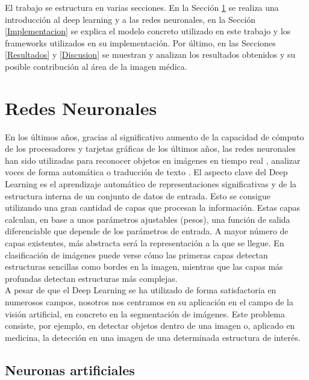 \documentclass[spanish,a4paper, 11pt]{article}
\numberwithin{equation}{section}
\numberwithin{table}{section}
\numberwithin{figure}{section}
\begin{document}
El trabajo se estructura en varias secciones. En la Sección \ref{RedesNeur} se realiza una introducción al deep learning y a las redes neuronales, en la Sección \ref{Implementacion} se explica el modelo concreto utilizado en este trabajo y los frameworks utilizados en su implementación. Por último, en las Secciones \ref{Resultados} y \ref{Discusion} se muestran y analizan los resultados obtenidos y su posible contribución al área de la imagen médica.

\newpage
\section{Redes Neuronales}
\label{RedesNeur}

En los últimos años, gracias al significativo aumento de la capacidad de cómputo de los procesadores y tarjetas gráficas de los últimos años, las redes neuronales han sido utilizadas para reconocer objetos en imágenes en tiempo real \cite{Redmon2015}, analizar voces de forma automática \cite{Hinton2012} o traducción de texto \cite{Vinyals2014}. El aspecto clave del Deep Learning es el aprendizaje automático de representaciones significativas y de la estructura interna de un conjunto de datos de entrada. Esto se consigue utilizando una gran cantidad de capas que procesan la información. Estas capas calculan, en base a unos parámetros ajustables (pesos), una función de salida diferenciable que depende de los parámetros de entrada. A mayor número de capas existentes, más abstracta será la representación a la que se llegue. En clasificación de imágenes puede verse cómo las primeras capas detectan estructuras sencillas como bordes en la imagen, mientras que las capas más profundas detectan estructuras más complejas.\\

A pesar de que el Deep Learning se ha utilizado de forma satisfactoria en numerosos campos, nosotros nos centramos en su aplicación en el campo de la visión artificial, en concreto en la segmentación de imágenes. Este problema consiste, por ejemplo, en detectar objetos dentro de una imagen o, aplicado en medicina, la detección en una imagen de una determinada estructura de interés.

\subsection{Neuronas artificiales}
\end{document}

